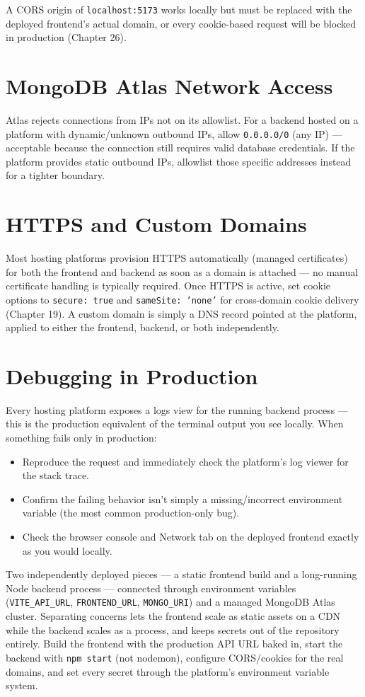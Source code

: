 A CORS origin of \texttt{localhost:5173} works locally but must be
replaced with the deployed frontend's actual domain, or every
cookie-based request will be blocked in production (Chapter 26).

\section{MongoDB Atlas Network Access}

Atlas rejects connections from IPs not on its allowlist. For a backend
hosted on a platform with dynamic/unknown outbound IPs, allow
\texttt{0.0.0.0/0} (any IP) --- acceptable because the connection still
requires valid database credentials. If the platform provides static
outbound IPs, allowlist those specific addresses instead for a tighter
boundary.

\section{HTTPS and Custom Domains}

Most hosting platforms provision HTTPS automatically (managed
certificates) for both the frontend and backend as soon as a domain is
attached --- no manual certificate handling is typically required. Once
HTTPS is active, set cookie options to \texttt{secure: true} and
\texttt{sameSite: 'none'} for cross-domain cookie delivery (Chapter 19).
A custom domain is simply a DNS record pointed at the platform, applied
to either the frontend, backend, or both independently.

\section{Debugging in Production}

Every hosting platform exposes a logs view for the running backend
process --- this is the production equivalent of the terminal output you
see locally. When something fails only in production:

\begin{itemize}
\item Reproduce the request and immediately check the platform's log
viewer for the stack trace.
\item Confirm the failing behavior isn't simply a missing/incorrect
environment variable (the most common production-only bug).
\item Check the browser console and Network tab on the deployed frontend
exactly as you would locally.
\end{itemize}

\whatwhyhow
{Two independently deployed pieces --- a static frontend build and a
long-running Node backend process --- connected through environment
variables (\texttt{VITE\_API\_URL}, \texttt{FRONTEND\_URL},
\texttt{MONGO\_URI}) and a managed MongoDB Atlas cluster.}
{Separating concerns lets the frontend scale as static assets on a CDN
while the backend scales as a process, and keeps secrets out of the
repository entirely.}
{Build the frontend with the production API URL baked in, start the
backend with \texttt{npm start} (not nodemon), configure CORS/cookies for
the real domains, and set every secret through the platform's environment
variable system.}
